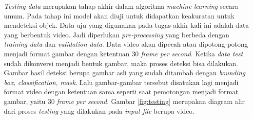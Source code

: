 \textit{Testing data} merupakan tahap akhir dalam algoritma \textit{machine learning} secara umum. Pada tahap ini model akan diuji untuk didapatkan keakuratan untuk mendeteksi objek. Data uju yang digunakan pada tugas akhir kali ini adalah data yang berbentuk video. Jadi diperlukan \textit{pre-processing} yang berbeda dengan \textit{training data} dan \textit{validation data}. Data video akan dipecah atau dipotong-potong menjadi format gambar dengan ketentuan 30 \textit{frame per second}. Ketika \textit{data test} sudah dikonversi menjadi bentuk gambar, maka proses deteksi bisa dilakukan. Gambar hasil deteksi berupa gambar asli yang sudah ditambah dengan \textit{bounding box, classification, mask}. Lalu gambar-gambar tersebut disatukan lagi menjadi format video dengan ketentuan sama seperti saat pemotongan menjadi format gambar, yaitu 30 \textit{frame per second}. Gambar \ref{fig:testing} merupakan diagram alir dari proses \textit{testing} yang dilakukan pada \textit{input file} berupa video. 


